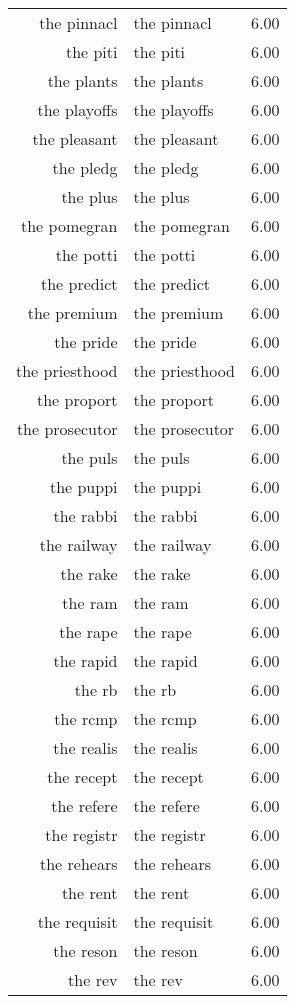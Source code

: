 \begin{table}[ht]
\begin{tabular}{rlr}
  the pinnacl & the pinnacl & 6.00 \\ 
  the piti & the piti & 6.00 \\ 
  the plants & the plants & 6.00 \\ 
  the playoffs & the playoffs & 6.00 \\ 
  the pleasant & the pleasant & 6.00 \\ 
  the pledg & the pledg & 6.00 \\ 
  the plus & the plus & 6.00 \\ 
  the pomegran & the pomegran & 6.00 \\ 
  the potti & the potti & 6.00 \\ 
  the predict & the predict & 6.00 \\ 
  the premium & the premium & 6.00 \\ 
  the pride & the pride & 6.00 \\ 
  the priesthood & the priesthood & 6.00 \\ 
  the proport & the proport & 6.00 \\ 
  the prosecutor & the prosecutor & 6.00 \\ 
  the puls & the puls & 6.00 \\ 
  the puppi & the puppi & 6.00 \\ 
  the rabbi & the rabbi & 6.00 \\ 
  the railway & the railway & 6.00 \\ 
  the rake & the rake & 6.00 \\ 
  the ram & the ram & 6.00 \\ 
  the rape & the rape & 6.00 \\ 
  the rapid & the rapid & 6.00 \\ 
  the rb & the rb & 6.00 \\ 
  the rcmp & the rcmp & 6.00 \\ 
  the realis & the realis & 6.00 \\ 
  the recept & the recept & 6.00 \\ 
  the refere & the refere & 6.00 \\ 
  the registr & the registr & 6.00 \\ 
  the rehears & the rehears & 6.00 \\ 
  the rent & the rent & 6.00 \\ 
  the requisit & the requisit & 6.00 \\ 
  the reson & the reson & 6.00 \\ 
  the rev & the rev & 6.00 \\ 

\end{tabular}
\end{table}
